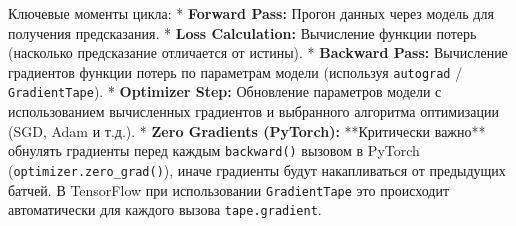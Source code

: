 \begin{alerttextbox}{Ключевые моменты цикла:}
    *   \textbf{Forward Pass:} Прогон данных через модель для получения предсказания.
    *   \textbf{Loss Calculation:} Вычисление функции потерь (насколько предсказание отличается от истины).
    *   \textbf{Backward Pass:} Вычисление градиентов функции потерь по параметрам модели (используя \texttt{autograd} / \texttt{GradientTape}).
    *   \textbf{Optimizer Step:} Обновление параметров модели с использованием вычисленных градиентов и выбранного алгоритма оптимизации (SGD, Adam и т.д.).
    *   \textbf{Zero Gradients (PyTorch):} **Критически важно** обнулять градиенты перед каждым \texttt{backward()} вызовом в PyTorch (\texttt{optimizer.zero\_grad()}), иначе градиенты будут накапливаться от предыдущих батчей. В TensorFlow при использовании \texttt{GradientTape} это происходит автоматически для каждого вызова \texttt{tape.gradient}.
\end{alerttextbox}


